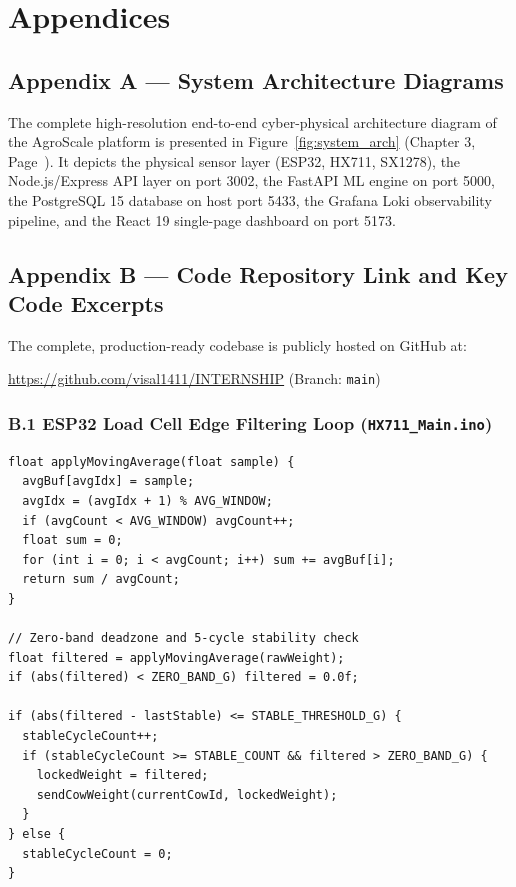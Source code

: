 \documentclass[11pt,a4paper]{report}
\begin{document}
\clearpage

\chapter*{Appendices}

\section*{Appendix A --- System Architecture Diagrams}
The complete high-resolution end-to-end cyber-physical architecture diagram of the AgroScale platform is presented in Figure~\ref{fig:system_arch} (Chapter 3, Page~\pageref{fig:system_arch}). It depicts the physical sensor layer (ESP32, HX711, SX1278), the Node.js/Express API layer on port 3002, the FastAPI ML engine on port 5000, the PostgreSQL 15 database on host port 5433, the Grafana Loki observability pipeline, and the React 19 single-page dashboard on port 5173.

\section*{Appendix B --- Code Repository Link and Key Code Excerpts}
The complete, production-ready codebase is publicly hosted on GitHub at:
\begin{center}
    \url{https://github.com/visal1411/INTERNSHIP} (Branch: \texttt{main})
\end{center}

\subsection*{B.1 ESP32 Load Cell Edge Filtering Loop (\texttt{HX711\_Main.ino})}
\begin{verbatim}
float applyMovingAverage(float sample) {
  avgBuf[avgIdx] = sample;
  avgIdx = (avgIdx + 1) % AVG_WINDOW;
  if (avgCount < AVG_WINDOW) avgCount++;
  float sum = 0;
  for (int i = 0; i < avgCount; i++) sum += avgBuf[i];
  return sum / avgCount;
}

// Zero-band deadzone and 5-cycle stability check
float filtered = applyMovingAverage(rawWeight);
if (abs(filtered) < ZERO_BAND_G) filtered = 0.0f;

if (abs(filtered - lastStable) <= STABLE_THRESHOLD_G) {
  stableCycleCount++;
  if (stableCycleCount >= STABLE_COUNT && filtered > ZERO_BAND_G) {
    lockedWeight = filtered;
    sendCowWeight(currentCowId, lockedWeight);
  }
} else {
  stableCycleCount = 0;
}
\end{verbatim}
\end{document}
